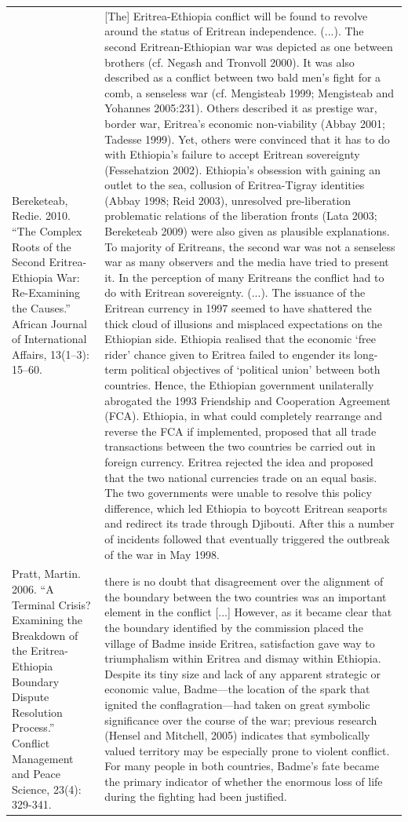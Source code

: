 {\begin{longtable}{p{}p{}}
\\
Bereketeab, Redie. 2010. “The Complex Roots of the Second Eritrea-Ethiopia War: Re-Examining the Causes.” African Journal of International Affairs, 13(1–3): 15–60. & [The] Eritrea-Ethiopia conflict will be found to revolve around the status of Eritrean independence. (...). The second Eritrean-Ethiopian war was depicted as one between brothers (cf. Negash and Tronvoll 2000). It was also described as a conflict between two bald men's fight for a comb, a senseless war (cf. Mengisteab 1999; Mengisteab and Yohannes 2005:231). Others described it as prestige war, border war, Eritrea's economic non-viability (Abbay 2001; Tadesse 1999). Yet, others were convinced that it has to do with Ethiopia's failure to accept Eritrean sovereignty (Fessehatzion 2002). Ethiopia's obsession with gaining an outlet to the sea, collusion of Eritrea-Tigray identities (Abbay 1998; Reid 2003), unresolved pre-liberation problematic relations of the liberation fronts (Lata 2003; Bereketeab 2009) were also given as plausible explanations. To majority of Eritreans, the second war was not a senseless war as many observers and the media have tried to present it. In the perception of many Eritreans the conflict had to do with Eritrean sovereignty. (...).
The issuance of the Eritrean currency in 1997 seemed to have shattered the thick cloud of illusions and misplaced expectations on the Ethiopian side. Ethiopia realised that the economic ‘free rider' chance given to Eritrea failed to engender its long-term political objectives of ‘political union' between both countries. Hence, the Ethiopian government unilaterally abrogated the 1993 Friendship and Cooperation Agreement (FCA). Ethiopia, in what could completely rearrange and reverse the FCA if implemented, proposed that all trade transactions between the two countries be carried out in foreign currency. Eritrea rejected the idea and proposed that the two national currencies trade on an equal basis. The two governments were unable to resolve this policy difference, which led Ethiopia to boycott Eritrean seaports and redirect its trade through Djibouti. After this a number of incidents followed that eventually triggered the outbreak of the war in May 1998.
\\
Pratt, Martin. 2006. “A Terminal Crisis? Examining the Breakdown of the Eritrea-Ethiopia Boundary Dispute Resolution Process.” Conflict Management and Peace Science, 23(4): 329-341. & there is no doubt that disagreement over the alignment of the boundary between the two countries was an important element in the conflict [...] However, as it became clear that the boundary identified by the commission placed the village of Badme inside Eritrea, satisfaction gave way to triumphalism within Eritrea and dismay within Ethiopia. Despite its tiny size and lack of any apparent strategic or economic value, Badme—the location of the spark that ignited the conflagration—had taken on great symbolic significance over the course of the war; previous research (Hensel and Mitchell, 2005) indicates that symbolically valued territory may be especially prone to violent conflict. For many people in both countries, Badme's fate became the primary indicator of whether the enormous loss of life during the fighting had been justified.

\end{longtable}}

